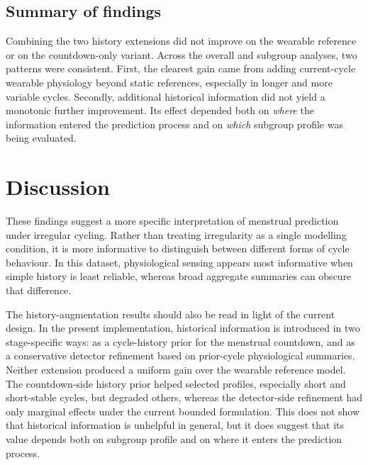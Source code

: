 \documentclass[conference]{IEEEtran}
\begin{document}
\subsection{Summary of findings}

Combining the two history extensions did not improve on the wearable reference or on the countdown-only variant. Across the overall and subgroup analyses, two patterns were consistent. First, the clearest gain came from adding current-cycle wearable physiology beyond static references, especially in longer and more variable cycles. Secondly, additional historical information did not yield a monotonic further improvement. Its effect depended both on \emph{where} the information entered the prediction process and on \emph{which} subgroup profile was being evaluated.

\section{Discussion}

These findings suggest a more specific interpretation of menstrual prediction under irregular cycling. Rather than treating irregularity as a single modelling condition, it is more informative to distinguish between different forms of cycle behaviour. In this dataset, physiological sensing appears most informative when simple history is least reliable, whereas broad aggregate summaries can obscure that difference.

The history-augmentation results should also be read in light of the current design. In the present implementation, historical information is introduced in two stage-specific ways: as a cycle-history prior for the menstrual countdown, and as a conservative detector refinement based on prior-cycle physiological summaries. Neither extension produced a uniform gain over the wearable reference model. The countdown-side history prior helped selected profiles, especially short and short-stable cycles, but degraded others, whereas the detector-side refinement had only marginal effects under the current bounded formulation. This does not show that historical information is unhelpful in general, but it does suggest that its value depends both on subgroup profile and on where it enters the prediction process.
\end{document}
